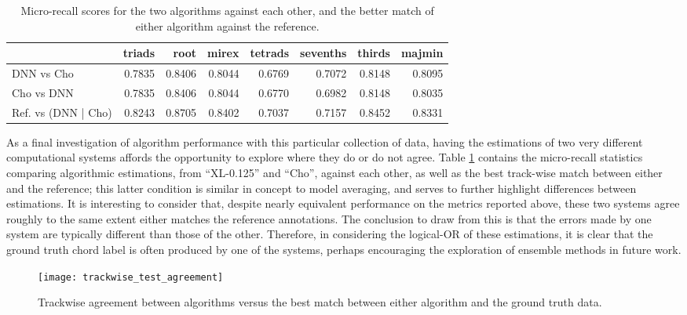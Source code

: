 \begin{table}[t]
\begin{center}
\scriptsize
\caption{Micro-recall scores for the two algorithms against each other, and the better match of either algorithm against the reference.}
\label{tab:algo_vs_algo}

\begin{tabular}{lrrrrrrr}
\hline
         &   triads &   root &   mirex &   tetrads &   sevenths &   thirds &   majmin \\
\hline
 DNN vs Cho &   0.7835 & 0.8406 &  0.8044 &    0.6769 &     0.7072 &   0.8148 &   0.8095 \\
 Cho vs DNN &   0.7835 & 0.8406 &  0.8044 &    0.6770 &     0.6982 &   0.8148 &   0.8035 \\
 \hline
 Ref. vs (DNN | Cho) &   0.8243 & 0.8705  &  0.8402  &   0.7037   &   0.7157  &  0.8452  &  0.8331 \\
\hline
\end{tabular}
\end{center}
\end{table}

As a final investigation of algorithm performance with this particular collection of data, having the estimations of two very different computational systems affords the opportunity to explore where they do or do not agree.
Table \ref{tab:algo_vs_algo} contains the micro-recall statistics comparing algorithmic estimations, from ``XL-0.125'' and ``Cho'', against each other, as well as the best track-wise match between either and the reference;
this latter condition is similar in concept to model averaging, and serves to further highlight differences between estimations.
It is interesting to consider that, despite nearly equivalent performance on the metrics reported above, these two systems agree roughly to the same extent either matches the reference annotations.
The conclusion to draw from this is that the errors made by one system are typically different than those of the other.
Therefore, in considering the logical-OR of these estimations, it is clear that the ground truth chord label is often produced by one of the systems, perhaps encouraging the exploration of ensemble methods in future work.


\begin{figure}[t]
\centering
\texttt{[image: trackwise\_test\_agreement]}
\caption{Trackwise agreement between algorithms versus the best match between either algorithm and the ground truth data.}
\label{fig:trackwise_test_agreement}
\end{figure}


